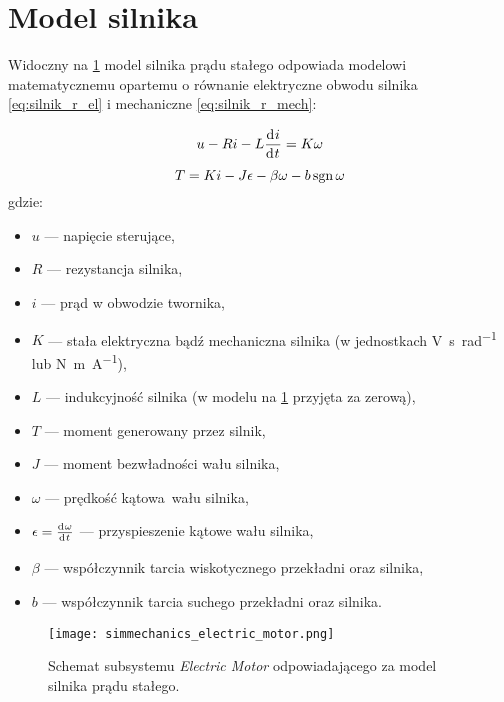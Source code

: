 \section{Model silnika}
\label{sec:ch4_model_silnika}

Widoczny na \cref{fig:sm_electric_motor} model silnika prądu stałego odpowiada modelowi matematycznemu opartemu o równanie elektryczne obwodu silnika \eqref{eq:silnik_r_el} i mechaniczne \eqref{eq:silnik_r_mech}:

\begin{equation}\label{eq:silnik_r_el}
    u - R i - L \deriv{i}{t} = K \omega 
\end{equation}
\begin{equation}\label{eq:silnik_r_mech}
    T = K i - J \epsilon - \beta \omega - b \operatorname{sgn} \omega
\end{equation}
gdzie:
\begin{itemize}
    \item $u$ --- napięcie sterujące,
    \item $R$ --- rezystancja silnika,
    \item $i$ --- prąd w obwodzie twornika,
    \item $K$ --- stała elektryczna bądź mechaniczna silnika (w jednostkach \si{\volt\second\per\radian} lub \si{\newton\meter\per\ampere}),
    \item $L$ --- indukcyjność silnika (w modelu na \cref{fig:sm_electric_motor} przyjęta za zerową),
    \item $T$ --- moment generowany przez silnik,
    \item $J$ --- moment bezwładności wału silnika,
    \item $\omega$ --- prędkość kątowa wału silnika,
    \item $\epsilon = \deriv{\omega}{t}$ --- przyspieszenie kątowe wału silnika,
    \item $\beta$ --- współczynnik tarcia wiskotycznego przekładni oraz silnika,
    \item $b$ --- współczynnik tarcia suchego przekładni oraz silnika.
\end{itemize}

\begin{figure}[h]
    \centering
    \texttt{[image: simmechanics\_electric\_motor.png]}
    \caption{Schemat subsystemu \textit{Electric Motor} odpowiadającego za model silnika prądu stałego.}
    \label{fig:sm_electric_motor}
\end{figure}

